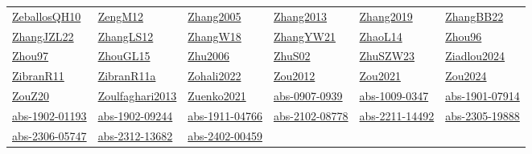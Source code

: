 \begin{longtable}{*{6}{l}}
\hyperref[detail:ZeballosQH10]{ZeballosQH10} & \hyperref[detail:ZengM12]{ZengM12} & \hyperref[detail:Zhang2005]{Zhang2005} & \hyperref[detail:Zhang2013]{Zhang2013} & \hyperref[detail:Zhang2019]{Zhang2019} & \hyperref[detail:ZhangBB22]{ZhangBB22}\\ 
\hyperref[detail:ZhangJZL22]{ZhangJZL22} & \hyperref[detail:ZhangLS12]{ZhangLS12} & \hyperref[detail:ZhangW18]{ZhangW18} & \hyperref[detail:ZhangYW21]{ZhangYW21} & \hyperref[detail:ZhaoL14]{ZhaoL14} & \hyperref[detail:Zhou96]{Zhou96}\\ 
\hyperref[detail:Zhou97]{Zhou97} & \hyperref[detail:ZhouGL15]{ZhouGL15} & \hyperref[detail:Zhu2006]{Zhu2006} & \hyperref[detail:ZhuS02]{ZhuS02} & \hyperref[detail:ZhuSZW23]{ZhuSZW23} & \hyperref[detail:Ziadlou2024]{Ziadlou2024}\\ 
\hyperref[detail:ZibranR11]{ZibranR11} & \hyperref[detail:ZibranR11a]{ZibranR11a} & \hyperref[detail:Zohali2022]{Zohali2022} & \hyperref[detail:Zou2012]{Zou2012} & \hyperref[detail:Zou2021]{Zou2021} & \hyperref[detail:Zou2024]{Zou2024}\\ 
\hyperref[detail:ZouZ20]{ZouZ20} & \hyperref[detail:Zoulfaghari2013]{Zoulfaghari2013} & \hyperref[detail:Zuenko2021]{Zuenko2021} & \hyperref[detail:abs-0907-0939]{abs-0907-0939} & \hyperref[detail:abs-1009-0347]{abs-1009-0347} & \hyperref[detail:abs-1901-07914]{abs-1901-07914}\\ 
\hyperref[detail:abs-1902-01193]{abs-1902-01193} & \hyperref[detail:abs-1902-09244]{abs-1902-09244} & \hyperref[detail:abs-1911-04766]{abs-1911-04766} & \hyperref[detail:abs-2102-08778]{abs-2102-08778} & \hyperref[detail:abs-2211-14492]{abs-2211-14492} & \hyperref[detail:abs-2305-19888]{abs-2305-19888}\\ 
\hyperref[detail:abs-2306-05747]{abs-2306-05747} & \hyperref[detail:abs-2312-13682]{abs-2312-13682} & \hyperref[detail:abs-2402-00459]{abs-2402-00459} & \end{longtable}
